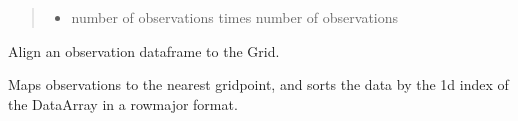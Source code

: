 \documentclass[letterpaper,10pt,english]{sphinxmanual}
\begin{document}
\begin{fulllineitems}
\begin{fulllineitems}
\begin{quote}
\begin{description}
\begin{itemize}
\begin{itemize}
\item {}
\sphinxAtStartPar
number of observations times number of observations

\end{itemize}


\end{itemize}

\sphinxAtStartPar
{}

\end{description}\end{quote}

\end{fulllineitems}


\begin{fulllineitems}
\label{\detokenize{grid:glomar_gridding.grid.Grid.map_observations}}
\pysigstartsignatures
\pysiglinewithargsret
{}
{\sphinxparamcomma {}\sphinxparamcomma {}\sphinxparamcomma {}\sphinxparamcomma {}\sphinxparamcomma {}\sphinxparamcomma {}\sphinxparamcomma {}\sphinxparamcomma {}}
{}
\pysigstopsignatures
\sphinxAtStartPar
Align an observation dataframe to the Grid.

\sphinxAtStartPar
Maps observations to the nearest grid\sphinxhyphen{}point, and sorts the data by the
1d index of the DataArray in a row\sphinxhyphen{}major format.


\end{fulllineitems}
\end{fulllineitems}
\end{document}
